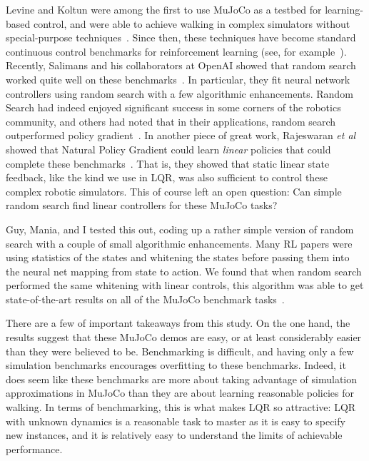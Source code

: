 \documentclass[11pt]{article}
\numberwithin{equation}{section}
\begin{document}
Levine and Koltun were among the first to use MuJoCo as a testbed for learning-based control, and were able to achieve walking in complex simulators without special-purpose techniques~\cite{levine2013guided}. Since then, these techniques have become standard continuous control benchmarks for reinforcement learning (see, for example~\cite{silver2014deterministic, lillicrap2015continuous, schulman2015trust, schulman2015high, wu2017scalable}). Recently, Salimans and his collaborators at OpenAI showed that random search worked quite well on these benchmarks~\cite{salimans2017evolution}. In particular, they fit neural network controllers using random search with a few algorithmic enhancements. Random Search had indeed enjoyed significant success in some corners of the robotics community, and others had noted that in their applications, random search outperformed policy gradient~\cite{Stulp13}.  In another piece of great work, Rajeswaran \emph{et al} showed that Natural Policy Gradient could learn \emph{linear} policies that could complete these benchmarks~\cite{rajeswaran2017towards}. That is, they showed that static linear state feedback, like the kind we use in LQR, was also sufficient to control these complex robotic simulators.  This of course left an open question: Can simple random search find linear controllers for these MuJoCo tasks?

Guy, Mania, and I tested this out, coding up a rather simple version of random search with a couple of small algorithmic enhancements. Many RL papers were using statistics of the states and whitening the states before passing them into the neural net mapping from state to action. We found that when random search performed the same whitening with linear controls, this algorithm was able to get state-of-the-art results on all of the MuJoCo benchmark tasks~\cite{Mania18b}.

There are a few of important takeaways from this study. On the one hand, the results suggest that these MuJoCo demos are easy, or at least considerably easier than they were believed to be. Benchmarking is difficult, and having only a few simulation benchmarks encourages overfitting to these benchmarks. Indeed, it does seem like these benchmarks are more about taking advantage of simulation approximations in MuJoCo than they are about learning reasonable policies for walking. In terms of benchmarking, this is what makes LQR so attractive: LQR with unknown dynamics is a reasonable task to master as it is easy to specify new instances, and it is relatively easy to understand the limits of achievable performance.
\end{document}
